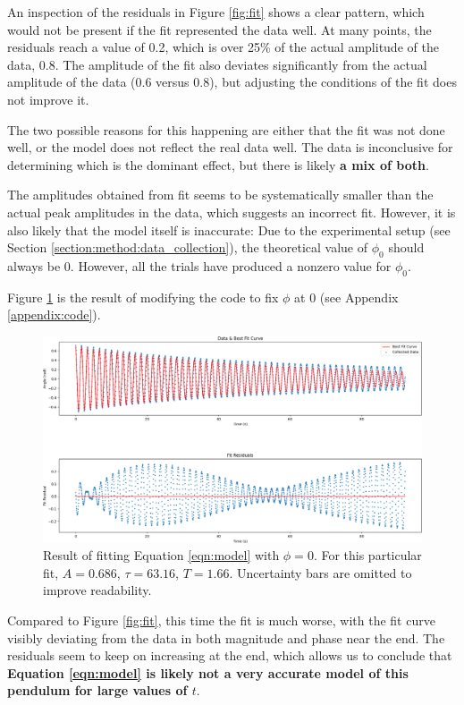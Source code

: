 \documentclass[aps,twocolumn,secnumarabic,nobalancelastpage,amsmath,amssymb,nofootinbib]{revtex4}
\begin{document}
An inspection of the residuals in Figure \ref{fig:fit} shows a clear pattern, which would not be present if the fit
represented the data well. At many points, the residuals reach a value of 0.2, which is over 25\% of the actual
amplitude of the data, 0.8. The amplitude of the fit also deviates significantly from the actual amplitude of the data
(0.6 versus 0.8), but adjusting the conditions of the fit does not improve it.

The two possible reasons for this happening are either that the fit was not done well, or the model does not reflect the
real data well. The data is inconclusive for determining which is the dominant effect, but there is likely \textbf{a mix
of both}.

The amplitudes obtained from fit seems to be systematically smaller than the actual peak amplitudes in the
data, which suggests an incorrect fit. However, it is also likely that the model itself is inaccurate: Due to the
experimental setup (see Section \ref{section:method:data_collection}), the theoretical value of \(\phi_0\) should
always be 0. However, all the trials have produced a nonzero value for \(\phi_0\).

Figure \ref{fig:fit_nophi} is the result of modifying the code to fix \(\phi\) at 0 (see Appendix \ref{appendix:code}).
\begin{figure}[htb]
    \includegraphics[width=0.9\linewidth]{fit3.png}
    \caption{Result of fitting Equation \ref{eqn:model} with \(\phi = 0\). For this particular fit, \(A = 0.686\),
    \(\tau = 63.16\), \(T = 1.66\). Uncertainty bars are omitted to improve readability.}
    \label{fig:fit_nophi}
\end{figure}

Compared to Figure \ref{fig:fit}, this time the fit is much worse, with the fit curve visibly deviating from the data in
both magnitude and phase near the end. The residuals seem to keep on increasing at the end, which allows us to conclude
that \textbf{Equation \ref{eqn:model} is likely not a very accurate model of this pendulum for large values of \(t\)}.
\end{document}
